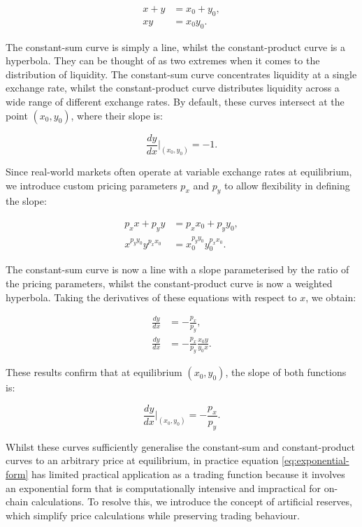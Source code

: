 \documentclass{article}
\begin{document}
\begin{align}
    x + y &= x_0 + y_0, \\
    xy &= x_0 y_0.
\end{align}

The constant-sum curve is simply a line, whilst the constant-product curve is a hyperbola. They can be thought of as two extremes when it comes to the distribution of liquidity. The constant-sum curve concentrates liquidity at a single exchange rate, whilst the constant-product curve distributes liquidity across a wide range of different exchange rates. By default, these curves intersect at the point $(x_0, y_0)$, where their slope is:

\[
\frac{dy}{dx} \Big|_{(x_0, y_0)} = -1.
\]

Since real-world markets often operate at variable exchange rates at equilibrium, we introduce custom pricing parameters $p_x$ and $p_y$ to allow flexibility in defining the slope:

\begin{align}
    p_x x + p_y y &= p_x x_0 + p_y y_0, \\
    \label{eq:exponential-form}
    x^{p_y y_0} y^{p_x x_0} &= x_0^{p_y y_0} y_0^{p_x x_0}.
\end{align}

The constant-sum curve is now a line with a slope parameterised by the ratio of the pricing parameters, whilst the constant-product curve is now a weighted hyperbola. Taking the derivatives of these equations with respect to $x$, we obtain:

\begin{align}
    \frac{dy}{dx} &= -\frac{p_x}{p_y}, \\
    \frac{dy}{dx} &= -\frac{p_x}{p_y} \frac{x_0 y}{y_0 x}.
\end{align}

These results confirm that at equilibrium $(x_0, y_0)$, the slope of both functions is:

\[
\frac{dy}{dx} \Big|_{(x_0, y_0)} = -\frac{p_x}{p_y}.
\]

Whilst these curves sufficiently generalise the constant-sum and constant-product curves to an arbitrary price at equilibrium, in practice equation \eqref{eq:exponential-form} has limited practical application as a trading function because it involves an exponential form that is computationally intensive and impractical for on-chain calculations. To resolve this, we introduce the concept of artificial reserves, which simplify price calculations while preserving trading behaviour.
\end{document}

